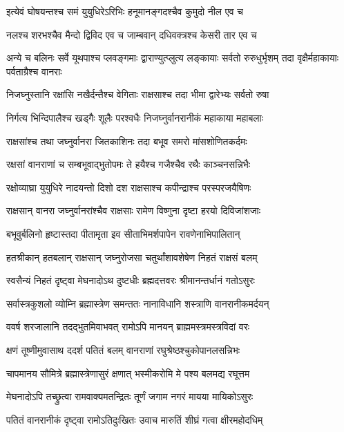 \twolineshloka
{इत्येवं घोषयन्तश्च समं युयुधिरेऽरिभिः}
{हनूमानङ्गदश्चैव कुमुदो नील एव च} %

\twolineshloka
{नलश्च शरभश्चैव मैन्दो द्विविद एव च}
{जाम्बवान् दधिवक्त्रश्च केसरी तार एव च} %

\threelineshloka
{अन्ये च बलिनः सर्वे यूथपाश्च प्लवङ्गमाः}
{द्वाराण्युत्प्लुत्य लङ्कायाः सर्वतो रुरुधुर्भृशम्}
{तदा वृक्षैर्महाकायाः पर्वताग्रैश्च वानराः} %

\twolineshloka
{निजघ्नुस्तानि रक्षांसि नखैर्दन्तैश्च वेगिताः}
{राक्षसाश्च तदा भीमा द्वारेभ्यः सर्वतो रुषा} %

\twolineshloka
{निर्गत्य भिन्दिपालैश्च खड्गैः शूलैः परश्वधैः}
{निजघ्नुर्वानरानीकं महाकाया महाबलाः} %

\twolineshloka
{राक्षसांश्च तथा जघ्नुर्वानरा जितकाशिनः}
{तदा बभूव समरो मांसशोणितकर्दमः} %

\twolineshloka
{रक्षसां वानराणां च सम्बभूवाद्भुतोपमः}
{ते हयैश्च गजैश्चैव रथैः काञ्चनसन्निभैः} %

\twolineshloka
{रक्षोव्याघ्रा युयुधिरे नादयन्तो दिशो दश}
{राक्षसाश्च कपीन्द्राश्च परस्परजयैषिणः} %

\twolineshloka
{राक्षसान् वानरा जघ्नुर्वानरांश्चैव राक्षसाः}
{रामेण विष्णुना दृष्टा हरयो दिविजांशजाः} %

\twolineshloka
{बभूवुर्बलिनो हृष्टास्तदा पीतामृता इव}
{सीताभिमर्शपापेन रावणेनाभिपालितान्} %

\twolineshloka
{हतश्रीकान् हतबलान् राक्षसान् जघ्नुरोजसा}
{चतुर्थांशावशेषेण निहतं राक्षसं बलम्} %

\twolineshloka
{स्वसैन्यं निहतं दृष्ट्वा मेघनादोऽथ दुष्टधीः}
{ब्रह्मदत्तवरः श्रीमानन्तर्धानं गतोऽसुरः} %

\twolineshloka
{सर्वास्त्रकुशलो व्योम्नि ब्रह्मास्त्रेण समन्ततः}
{नानाविधानि शस्त्राणि वानरानीकमर्दयन्} %

\twolineshloka
{ववर्ष शरजालानि तदद्भुतमिवाभवत्}
{रामोऽपि मानयन् ब्राह्ममस्त्रमस्त्रविदां वरः} %

\twolineshloka
{क्षणं तूष्णीमुवासाथ ददर्श पतितं बलम्}
{वानराणां रघुश्रेष्ठश्चुकोपानलसन्निभः} %

\twolineshloka
{चापमानय सौमित्रे ब्रह्मास्त्रेणासुरं क्षणात्}
{भस्मीकरोमि मे पश्य बलमद्य रघूत्तम} %

\twolineshloka
{मेघनादोऽपि तच्छ्रुत्वा रामवाक्यमतन्द्रितः}
{तूर्णं जगाम नगरं मायया मायिकोऽसुरः} %

\twolineshloka
{पतितं वानरानीकं दृष्ट्वा रामोऽतिदुःखितः}
{उवाच मारुतिं शीघ्रं गत्वा क्षीरमहोदधिम्} %

